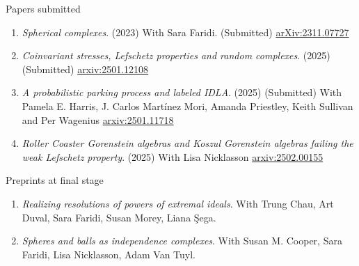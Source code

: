 \documentclass[12pt]{resume} %
\begin{document}
\begin{rSection}{Papers submitted}

\begin{enumerate}
    \item \textit{Spherical complexes}. (2023) With Sara Faridi. (Submitted) \href{https://arxiv.org/abs/2311.07727}{arXiv:2311.07727}
    \item \textit{Coinvariant stresses, Lefschetz properties and random complexes}. (2025) (Submitted) \href{https://arxiv.org/abs/2501.12108}{arxiv:2501.12108}
    \item \textit{A probabilistic parking process and labeled IDLA}. (2025) (Submitted) With Pamela E. Harris, J. Carlos Martínez Mori, Amanda Priestley, Keith Sullivan and Per Wagenius  \href{https://arxiv.org/abs/2501.11718}{arxiv:2501.11718}
    \item \textit{Roller Coaster Gorenstein algebras and Koszul Gorenstein algebras failing the weak Lefschetz property}. (2025) With Lisa Nicklasson  \href{https://arxiv.org/abs/2502.00155}{arxiv:2502.00155}
\end{enumerate}
\end{rSection}


\begin{rSection}{Preprints at final stage}

    \begin{enumerate}
        \item \textit{Realizing resolutions of powers of extremal ideals}. With Trung Chau, Art Duval, Sara Faridi, Susan Morey, Liana \c{S}ega.
        \item \textit{Spheres and balls as independence complexes}. With Susan M. Cooper, Sara Faridi, Lisa Nicklasson, Adam Van Tuyl. 
    \end{enumerate}
\end{rSection}

\end{document}
